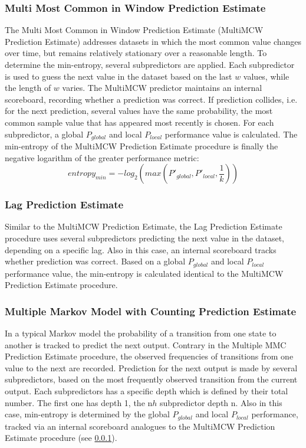 \subsubsection{Multi Most Common in Window Prediction Estimate}\label{non-iid-est:mmcwpe}
The Multi Most Common in Window Prediction Estimate (MultiMCW Prediction Estimate) addresses datasets in which the most common value changes over time, but remains relatively stationary over a reasonable length. To determine the min-entropy, several subpredictors are applied. Each subpredictor is used to guess the next value in the dataset based on the last $w$ values, while the length of $w$ varies. The MultiMCW predictor maintains an internal scoreboard, recording whether a prediction was correct. If prediction collides, i.e. for the next prediction, several values have the same probability, the most common sample value that has appeared most recently is chosen. For each subpredictor, a global $P_{global}$ and local $P_{local}$ performance value is calculated.
The min-entropy of the MultiMCW Prediction Estimate procedure is finally the negative logarithm of the greater performance metric:
\begin{equation}
entropy_{min} = -log_2\left(max\left(P'_{global}, P'_{local}, \frac{1}{k}\right)\right)
\end{equation}

\subsubsection{Lag Prediction Estimate}\label{non-iid-est:lpe}
Similar to the MultiMCW Prediction Estimate, the Lag Prediction Estimate procedure uses several subpredictors predicting the next value in the dataset, depending on a specific lag. Also in this case, an internal scoreboard tracks whether prediction was correct. Based on a global $P_{global}$ and local $P_{local}$ performance value, the min-entropy is calculated identical to the MultiMCW Prediction Estimate procedure. 

\subsubsection{Multiple Markov Model with Counting Prediction Estimate}\label{non-iid-est:mmcpe}
In a typical Markov model the probability of a transition from one state to another is tracked to predict the next output. Contrary in the Multiple MMC Prediction Estimate procedure, the observed frequencies of transitions from one value to the next are recorded. Prediction for the next output is made by several subpredictors, based on the most frequently observed transition from the current output. Each subpredictors has a specific depth which is defined by their total number. The first one has depth 1, the n$h$ subpredictor depth n. Also in this case, min-entropy is determined by the global $P_{global}$ and local $P_{local}$ performance, tracked via an internal scoreboard analogues to the MultiMCW Prediction Estimate procedure (see \ref{non-iid-est:mmcwpe}).

